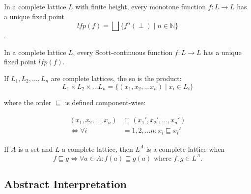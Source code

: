 \begin{theorem}\label{thm:kleene_finite}
    In a complete lattice $L$ with finite height, every monotone function $f : L \rightarrow L$ has a unique fixed point
    \begin{equation*}
        lfp(f) = \bigsqcup\{f^n(\perp) \mid n \in \mathbb{N}\}
    \end{equation*}.
\end{theorem}


\begin{theorem}\label{thm:kleene_scott}
    In a complete lattice $L$, every Scott-continuous function $f : L \rightarrow L$ has a unique fixed point $lfp(f)$.
\end{theorem}


\begin{theorem}
    If $L_1, L_2, \dots, L_n$ are complete lattices, the so is the product:
    \begin{equation*}
        L_1 \times L_2 \times \dots L_n = \{(x_1, x_2, \dots x_n) \mid x_i \in L_i\}
    \end{equation*}

    where the order $\sqsubseteq$ is defined component-wise:

    \begin{align*}
        \begin{split}
        (x_1, x_2, \dots, x_n) &\sqsubseteq (x_1', x_2', \dots, x_n') \\
        \iff
        \forall i &= 1, 2, \dots n : x_i \sqsubseteq x_i'
        \end{split}
    \end{align*}
\end{theorem}

\begin{theorem}
    If $A$ is a set and $L$ a complete lattice, then $L^A$ is a complete lattice when
    \begin{equation}
        f \sqsubseteq g \iff \forall a \in A : f(a) \sqsubseteq g(a) \text{ where } f,g \in L^A.\label{eq:equation-complete-lattice-theorem}
    \end{equation}

\end{theorem}


\subsection{Abstract Interpretation}\label{subsec:abstract-interpretation}

